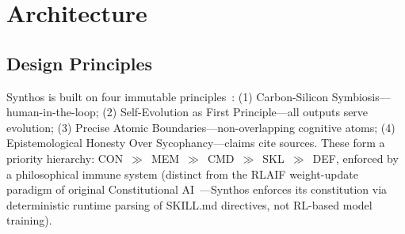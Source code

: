 \documentclass[review]{elsarticle}
\begin{document}
\section{Architecture}
\label{sec:architecture}

\subsection{Design Principles}

Synthos is built on four immutable principles~\cite{yang2026synthosconst}: (1) Carbon-Silicon Symbiosis---human-in-the-loop; (2) Self-Evolution as First Principle---all outputs serve evolution; (3) Precise Atomic Boundaries---non-overlapping cognitive atoms; (4) Epistemological Honesty Over Sycophancy---claims cite sources. These form a priority hierarchy: CON~$\gg$~MEM~$\gg$~CMD~$\gg$~SKL~$\gg$~DEF, enforced by a philosophical immune system (distinct from the RLAIF weight-update paradigm of original Constitutional AI~\cite{bai2022constitutional}---Synthos enforces its constitution via deterministic runtime parsing of SKILL.md directives, not RL-based model training).
\end{document}
